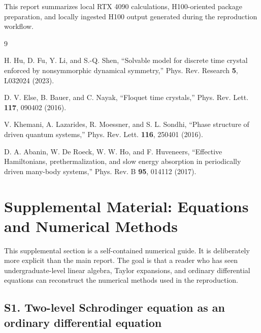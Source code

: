 \documentclass[aps,pra,preprint,superscriptaddress,nofootinbib]{revtex4-2}
\begin{document}
\begin{acknowledgments}
This report summarizes local RTX 4090 calculations, H100-oriented package preparation, and locally ingested H100 output generated during the reproduction workflow.
\end{acknowledgments}

\begin{thebibliography}{9}

H. Hu, D. Fu, Y. Li, and S.-Q. Shen,
``Solvable model for discrete time crystal enforced by nonsymmorphic dynamical symmetry,''
Phys. Rev. Research \textbf{5}, L032024 (2023).

D. V. Else, B. Bauer, and C. Nayak,
``Floquet time crystals,''
Phys. Rev. Lett. \textbf{117}, 090402 (2016).

V. Khemani, A. Lazarides, R. Moessner, and S. L. Sondhi,
``Phase structure of driven quantum systems,''
Phys. Rev. Lett. \textbf{116}, 250401 (2016).

D. A. Abanin, W. De Roeck, W. W. Ho, and F. Huveneers,
``Effective Hamiltonians, prethermalization, and slow energy absorption in periodically driven many-body systems,''
Phys. Rev. B \textbf{95}, 014112 (2017).

\end{thebibliography}

\clearpage
\section*{Supplemental Material: Equations and Numerical Methods}

This supplemental section is a self-contained numerical guide. It is deliberately more explicit than the main report. The goal is that a reader who has seen undergraduate-level linear algebra, Taylor expansions, and ordinary differential equations can reconstruct the numerical methods used in the reproduction.

\subsection*{S1. Two-level Schrodinger equation as an ordinary differential equation}
\end{document}
